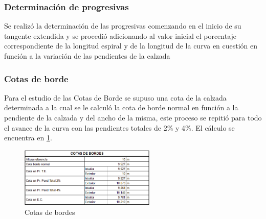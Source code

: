 \documentclass[../main.tex]{subfiles}
\begin{document}
\subsubsection{Determinación de progresivas}
Se realizó la determinación de las progresivas comenzando en el inicio de su tangente extendida y se procedió adicionando al valor inicial el porcentaje correspondiente de la longitud espiral y de la longitud de la curva en cuestión en función a la variación de las pendientes de la calzada 


\subsubsection{Cotas de borde}
Para el estudio de las Cotas de Borde se supuso una cota de la calzada determinada a la cual se le calculó la cota de borde normal en función a la pendiente de la calzada y del ancho de la misma, este proceso se repitió para todo el avance de la curva con las pendientes totales de 2\% y 4\%. El cálculo se encuentra en \cref{fig:cotas_bordes}.

\begin{figure}[ht]
    \centering
    \includegraphics[width=0.575\textwidth]{images/google_sheets/Screenshot_5.png}
    \caption{Cotas de bordes}
    \label{fig:cotas_bordes}
\end{figure}
\end{document}
